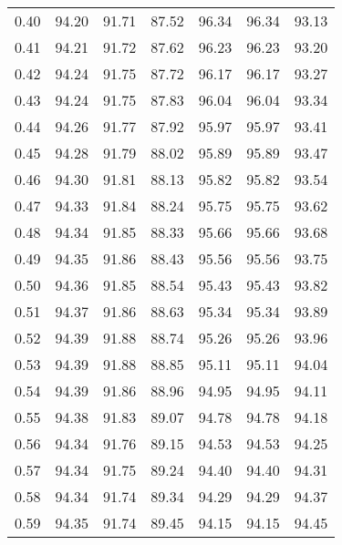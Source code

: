 \begin{tabular}{|c|c|c|c|c|c|c|}
      0.40 &     94.20 &     91.71 &      87.52 &   96.34 &      96.34 &         93.13 \\
      0.41 &     94.21 &     91.72 &      87.62 &   96.23 &      96.23 &         93.20 \\
      0.42 &     94.24 &     91.75 &      87.72 &   96.17 &      96.17 &         93.27 \\
      0.43 &     94.24 &     91.75 &      87.83 &   96.04 &      96.04 &         93.34 \\
      0.44 &     94.26 &     91.77 &      87.92 &   95.97 &      95.97 &         93.41 \\
      0.45 &     94.28 &     91.79 &      88.02 &   95.89 &      95.89 &         93.47 \\
      0.46 &     94.30 &     91.81 &      88.13 &   95.82 &      95.82 &         93.54 \\
      0.47 &     94.33 &     91.84 &      88.24 &   95.75 &      95.75 &         93.62 \\
      0.48 &     94.34 &     91.85 &      88.33 &   95.66 &      95.66 &         93.68 \\
      0.49 &     94.35 &     91.86 &      88.43 &   95.56 &      95.56 &         93.75 \\
      0.50 &     94.36 &     91.85 &      88.54 &   95.43 &      95.43 &         93.82 \\
      0.51 &     94.37 &     91.86 &      88.63 &   95.34 &      95.34 &         93.89 \\
      0.52 &     94.39 &     91.88 &      88.74 &   95.26 &      95.26 &         93.96 \\
      0.53 &     94.39 &     91.88 &      88.85 &   95.11 &      95.11 &         94.04 \\
      0.54 &     94.39 &     91.86 &      88.96 &   94.95 &      94.95 &         94.11 \\
      0.55 &     94.38 &     91.83 &      89.07 &   94.78 &      94.78 &         94.18 \\
      0.56 &     94.34 &     91.76 &      89.15 &   94.53 &      94.53 &         94.25 \\
      0.57 &     94.34 &     91.75 &      89.24 &   94.40 &      94.40 &         94.31 \\
      0.58 &     94.34 &     91.74 &      89.34 &   94.29 &      94.29 &         94.37 \\
      0.59 &     94.35 &     91.74 &      89.45 &   94.15 &      94.15 &         94.45 \\

\end{tabular}
